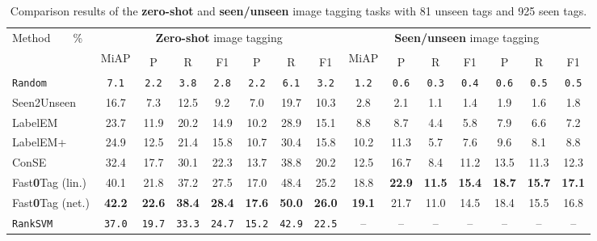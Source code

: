 \documentclass[10pt,twocolumn,letterpaper]{article}
\begin{document}
\begin{table*}
    \centering
\caption{Comparison results of the \textbf{zero-shot} and \textbf{seen/unseen} image tagging tasks with 81 unseen tags and 925 seen tags.}
\vspace{-10pt}
\label{tZSL}
\small
\begin{tabular}{|l|c|c|c|c|c|c|c||c|c|c|c|c|c|c|}
\hline
\multirow{3}{*}{ Method~~~~\%} & \multicolumn{7}{c||}{{\bf Zero-shot} image tagging} & \multicolumn{7}{|c|}{\textbf{Seen/unseen} image tagging}\\
\hhline{~--------------} 
& \multirow{2}{*}{ MiAP} & \multicolumn{3}{c|}{} & \multicolumn{3}{|c||}{} & \multirow{2}{*}{ MiAP} & \multicolumn{3}{c|}{} & \multicolumn{3}{|c|}{}\\
    & & P & R  & { F1} & P & R & { F1} &  & P & R  & { F1} & P & R & { F1} \\
    
\hline\hline
{\tt Random} & {\tt 7.1}  & {\tt 2.2} & {\tt 3.8} & {\tt 2.8}  & {\tt 2.2} & {\tt 6.1} & {\tt 3.2} & {\tt 1.2}& {\tt 0.6} & {\tt 0.3} & {\tt 0.4} & {\tt 0.6} & {\tt 0.5} & {\tt 0.5}  \\
\hline
Seen2Unseen & 16.7  & 7.3 & 12.5 & 9.2  & 7.0 & 19.7 & 10.3 & 2.8  & 2.1 & 1.1 & 1.4 & 1.9 & 1.6 & 1.8 \\
\hline
LabelEM~\cite{akata_evaluation_2015} & 23.7 & 11.9 & 20.2 & 14.9  & 10.2 & 28.9 & 15.1 & 8.8 & 8.7 & 4.4 & 5.8  & 7.9 & 6.6 & 7.2 \\
\hline
 LabelEM+~\cite{akata_evaluation_2015} & 24.9 & 12.5 & 21.4 & 15.8 & 10.7 & 30.4 & 15.8 & 10.2  & 11.3 & 5.7 & 7.6  & 9.6 & 8.1 & 8.8 \\
\hline
 ConSE~\cite{norouzi_zero-shot_2013} & 32.4  & 17.7 & 30.1 & 22.3  & 13.7 & 38.8 & 20.2 & 12.5  & 16.7 & 8.4 & 11.2 & 13.5 & 11.3 & 12.3 \\
\hline

{ Fast\textbf{0}Tag (lin.)}& 40.1  & 21.8 & 37.2 & 27.5  & 17.0 & 48.4 & 25.2 & 18.8  & {\bf 22.9} & {\bf 11.5} & {\bf 15.4}  & {\bf 18.7} & {\bf 15.7} & {\bf 17.1} \\
\hline
{ Fast\textbf{0}Tag (net.)} & {\bf 42.2}  & {\bf 22.6} & {\bf 38.4} & {\bf 28.4}  & {\bf 17.6} & {\bf 50.0} & {\bf 26.0} &  {\bf 19.1} & 21.7 & 11.0 & 14.5  & 18.4 & 15.5 & 16.8\\
\hline
{\tt RankSVM } & {\tt 37.0}  & {\tt 19.7} & {\tt 33.3} & {\tt 24.7}  & {\tt 15.2} & {\tt 42.9} & {\tt 22.5} & --& -- & -- & -- & -- & -- & -- \\
\hline
\end{tabular}
\vspace{-5pt}
\end{table*}
\end{document}
